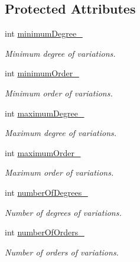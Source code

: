\subsection*{Protected Attributes}
\begin{DoxyCompactItemize}
\item 
int \hyperlink{classtudat_1_1gravitation_1_1GravityFieldVariations_a9bf8b72830d19d382bcdc935cd69c69e}{minimum\+Degree\+\_\+}
\begin{DoxyCompactList}\small\item\em Minimum degree of variations. \end{DoxyCompactList}\item 
int \hyperlink{classtudat_1_1gravitation_1_1GravityFieldVariations_a6f6ab951e6a5ec1ca230d629ae2a1104}{minimum\+Order\+\_\+}
\begin{DoxyCompactList}\small\item\em Minimum order of variations. \end{DoxyCompactList}\item 
int \hyperlink{classtudat_1_1gravitation_1_1GravityFieldVariations_a5014de246777abec5b844b7585d7efea}{maximum\+Degree\+\_\+}
\begin{DoxyCompactList}\small\item\em Maximum degree of variations. \end{DoxyCompactList}\item 
int \hyperlink{classtudat_1_1gravitation_1_1GravityFieldVariations_ab5d6f1bd7478e0a44dd6145cfa834242}{maximum\+Order\+\_\+}
\begin{DoxyCompactList}\small\item\em Maximum order of variations. \end{DoxyCompactList}\item 
int \hyperlink{classtudat_1_1gravitation_1_1GravityFieldVariations_a236edca529bfd6895123089bcfaf883d}{number\+Of\+Degrees\+\_\+}
\begin{DoxyCompactList}\small\item\em Number of degrees of variations. \end{DoxyCompactList}\item 
int \hyperlink{classtudat_1_1gravitation_1_1GravityFieldVariations_a8235f01b085cb96035fb7473526e938b}{number\+Of\+Orders\+\_\+}
\begin{DoxyCompactList}\small\item\em Number of orders of variations. \end{DoxyCompactList}\end{DoxyCompactItemize}


